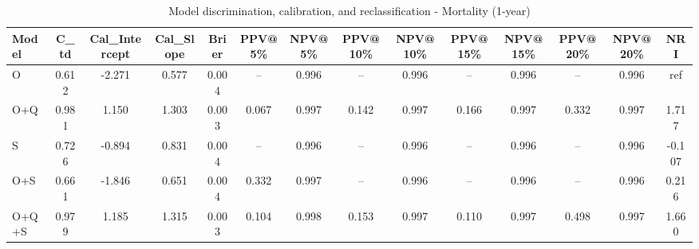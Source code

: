 \begin{table}[htbp]
\centering
\small
\caption{Model discrimination, calibration, and reclassification - Mortality (1-year)}
\label{tab:perf_mortality_1y}
\begin{tabular}{lccccccccccccc}
\toprule
Model & C\_td & Cal\_Intercept & Cal\_Slope & Brier & PPV@5\% & NPV@5\% & PPV@10\% & NPV@10\% & PPV@15\% & NPV@15\% & PPV@20\% & NPV@20\% & NRI \\
\midrule
O & 0.612 & -2.271 & 0.577 & 0.004 & -- & 0.996 & -- & 0.996 & -- & 0.996 & -- & 0.996 & ref \\
O+Q & 0.981 & 1.150 & 1.303 & 0.003 & 0.067 & 0.997 & 0.142 & 0.997 & 0.166 & 0.997 & 0.332 & 0.997 & 1.717 \\
S & 0.726 & -0.894 & 0.831 & 0.004 & -- & 0.996 & -- & 0.996 & -- & 0.996 & -- & 0.996 & -0.107 \\
O+S & 0.661 & -1.846 & 0.651 & 0.004 & 0.332 & 0.997 & -- & 0.996 & -- & 0.996 & -- & 0.996 & 0.216 \\
O+Q+S & 0.979 & 1.185 & 1.315 & 0.003 & 0.104 & 0.998 & 0.153 & 0.997 & 0.110 & 0.997 & 0.498 & 0.997 & 1.660 \\
\bottomrule
\end{tabular}
\end{table}